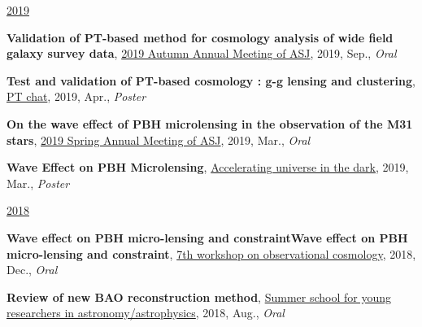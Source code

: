 \underline{2019}
\begin{etaremune}
\setcounter{enumi}{7}
\item \textbf{Validation of PT-based method for cosmology analysis of wide field galaxy survey data}, \href{https://www.asj.or.jp/nenkai/archive/2019b/pdf/U20a.pdf}{2019 Autumn Annual Meeting of ASJ}, 2019, Sep., \textit{Oral}
\item \textbf{Test and validation of PT-based cosmology : g-g lensing and clustering}, \href{http://pt-chat-kyoto.sciencesconf.org/}{PT chat}, 2019, Apr., \textit{Poster}
\item \textbf{On the wave effect of PBH microlensing in the observation of the M31 stars}, \href{https://www.asj.or.jp/nenkai/archive/2019a/pdf/U14a.pdf}{2019 Spring Annual Meeting of ASJ}, 2019, Mar., \textit{Oral}
\item \textbf{Wave Effect on PBH Microlensing}, \href{http://www2.yukawa.kyoto-u.ac.jp/~aud2019/index.php}{Accelerating universe in the dark}, 2019, Mar., \textit{Poster}
\end{etaremune}

\underline{2018}
\begin{etaremune}
\setcounter{enumi}{3}
\item \textbf{Wave effect on PBH micro-lensing and constraintWave effect on PBH micro-lensing and constraint}, \href{http://web.cc.yamaguchi-u.ac.jp/~rsaito/obscosmo2018/}{7th workshop on observational cosmology}, 2018, Dec., \textit{Oral}
\item \textbf{Review of new BAO reconstruction method}, \href{http://www.astro-wakate.org/ss2018/web/link.html}{Summer school for young researchers in astronomy/astrophysics}, 2018, Aug., \textit{Oral}
\end{etaremune}